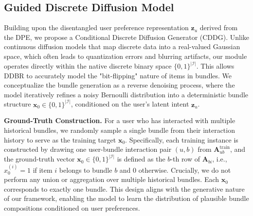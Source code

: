 \documentclass[lettersize,journal]{IEEEtran}
\begin{document}
\subsection{Guided Discrete Diffusion Model}
\label{sec:diffusion}

Building upon the disentangled user preference representation $\mathbf{z}_u$ derived from the DPE, we propose a Conditional Discrete Diffusion Generator (CDDG). Unlike continuous diffusion models that map discrete data into a real-valued Gaussian space, which often leads to quantization errors and blurring artifacts, our module operates directly within the native discrete binary space $\{0, 1\}^{|\mathcal{I}|}$. This allows DDBR to accurately model the "bit-flipping" nature of items in bundles.
We conceptualize the bundle generation as a reverse denoising process, where the model iteratively refines a noisy Bernoulli distribution into a deterministic bundle structure $\mathbf{x}_0 \in \{0, 1\}^{|\mathcal{I}|}$, conditioned on the user's latent intent $\mathbf{z}_u$.

\noindent\textbf{Ground-Truth Construction.}
For a user who has interacted with multiple historical bundles, we randomly sample a single bundle from their interaction history to serve as the training target $\mathbf{x}_0$. Specifically, each training instance is constructed by drawing one user-bundle interaction pair $(u, b)$ from $\mathbf{A}_{ub}^{\text{train}}$, and the ground-truth vector $\mathbf{x}_0 \in \{0,1\}^{|\mathcal{I}|}$ is defined as the $b$-th row of $\mathbf{A}_{bi}$, i.e., $x_0^{(i)} = 1$ if item $i$ belongs to bundle $b$ and $0$ otherwise. Crucially, we do not perform any union or aggregation over multiple historical bundles. Each $\mathbf{x}_0$ corresponds to exactly one bundle. This design aligns with the generative nature of our framework, enabling the model to learn the distribution of plausible bundle compositions conditioned on user preferences.
\end{document}
